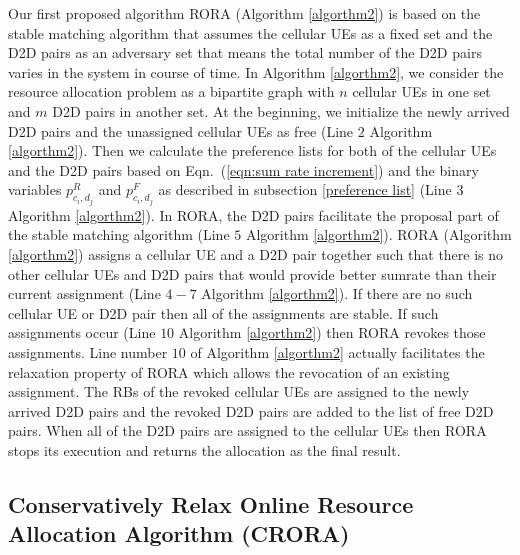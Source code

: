 \documentclass[times]{dacauth}
\begin{document}
\medskip
\noindent
Our first proposed algorithm RORA (Algorithm \ref{algorthm2}) is based on the stable matching algorithm \cite{knuth1976mariages} that assumes the cellular UEs as a fixed set and the D2D pairs as an adversary set that means the total number of the D2D pairs varies in the system in course of time. In Algorithm \ref{algorthm2}, we consider the resource allocation problem as a bipartite graph with $n$ cellular UEs in one set and $m$ D2D pairs in another set. At the beginning, we initialize the newly arrived D2D pairs and the unassigned cellular UEs as free (Line $2$ Algorithm \ref{algorthm2}). 
Then we calculate the preference lists for both of the cellular UEs and the D2D pairs based on Eqn.~(\ref{eqn:sum rate increment}) and the binary variables $p_{c_i,d_j}^{R}$ and $p_{c_i,d_j}^{F}$ as described in subsection \ref{preference list}       (Line $3$ Algorithm \ref{algorthm2}). In RORA, the D2D pairs facilitate the proposal part of the stable matching algorithm (Line $5$ Algorithm \ref{algorthm2}). RORA (Algorithm \ref{algorthm2}) assigns a cellular UE and a D2D pair together such that there is no other cellular UEs and D2D pairs that would provide better sumrate than their current assignment (Line $4-7$ Algorithm \ref{algorthm2}). If there are no such cellular UE or D2D pair then all of the assignments are stable. If such assignments occur (Line $10$  Algorithm \ref{algorthm2}) then RORA revokes those assignments. Line number $10$ of Algorithm \ref{algorthm2} actually facilitates the relaxation property of RORA which allows the revocation of an existing assignment. The RBs of the revoked cellular UEs are assigned to the newly arrived D2D pairs and the revoked D2D pairs are added to the list of free D2D pairs. When all of the D2D pairs are assigned to the cellular UEs then RORA stops its execution and returns the allocation as the final result. 
 
 
\subsection{Conservatively Relax Online Resource Allocation Algorithm (CRORA)}
 
\end{document}
